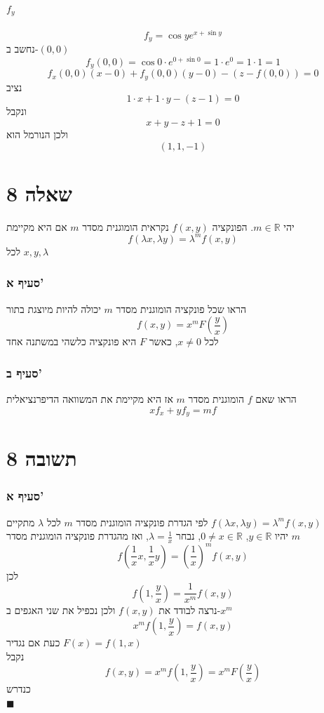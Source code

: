 \documentclass[12pt, titlepage]{article}
\begin{document}
\subsection*{$f_y$}
\[
    f_y = \cos y e^{x+\sin y} 
\]
נחשב ב-$\left(0,0\right)$
\[
    f_y\left(0,0\right) = \cos 0 \cdot e^{0+\sin 0} = 1 \cdot e^0 = 1 \cdot 1 = 1
\]
\[
     f_x \left(0,0\right) \left(x-0\right) + f_y\left(0,0\right) \left(y-0\right) - \left(z-f\left(0,0\right)\right) = 0
\]
נציב
\[
    1 \cdot x + 1 \cdot y - \left(z - 1\right) = 0
\]
ונקבל
\[
    \boxed{x + y - z + 1 = 0}
\]
ולכן הנורמל הוא
\[
    \boxed{\left(1,1,-1\right)}
\]
\newpage
\part*{שאלה 8}
יהי $m \in \mathbb{R}$. הפונקציה $f\left(x,y\right)$ נקראית הומוגנית מסדר $m$ אם היא מקיימת 
\[
    f\left(\lambda x, \lambda y\right) = \lambda^m f\left(x,y\right)
\]
לכל $x,y,\lambda$
\section*{סעיף א'}
הראו שכל פונקציה הומוגנית מסדר $m$ יכולה להיות מיוצגת בתור 
\[
    f\left(x,y\right) = x^m F\left(\frac{y}{x}\right)
\]
לכל $x\neq 0$, כאשר $F$ היא פונקציה כלשהי במשתנה אחד
\section*{סעיף ב'}
הראו שאם $f$ הומוגנית מסדר $m$ אז היא מקיימת את המשוואה הדיפרנציאלית
\[
    x f_x + y f_y = m f
\]
\part*{תשובה 8}
\section*{סעיף א'}
לפי הגדרת פונקציה הומוגנית מסדר $m$ לכל $\lambda$ מתקיים $f\left(\lambda x,\lambda y\right) =\lambda^m f\left(x,y\right)$ \\
יהיו $y \in \mathbb{R}$, $0\neq x \in \mathbb{R}$, נבחר $\lambda = \frac{1}{x}$, ואז מהגדרת פונקציה הומוגנית מסדר $m$
\[
    f\left(\frac{1}{x} x, \frac{1}{x} y\right) = \left(\frac{1}{x}\right)^m f\left(x,y\right)
\]
לכן
\[
    f\left(1,\frac{y}{x}\right) = \frac{1}{x^m} f\left(x,y\right)
\]
נרצה לבודד את $f\left(x,y\right)$ ולכן נכפיל את שני האגפים ב-$x^m$
\[
    x^m f\left(1,\frac{y}{x}\right) = f\left(x,y\right)
\]
כעת אם נגדיר $F\left(x\right) = f\left(1,x\right)$\\
נקבל
\[
    f\left(x,y\right) = x^m f\left(1,\frac{y}{x}\right) = x^m F\left(\frac{y}{x}\right)
\]
כנדרש\\
$\blacksquare$
\end{document}
